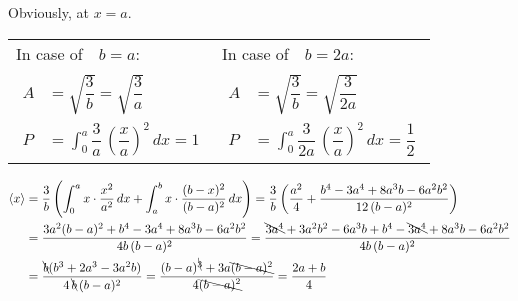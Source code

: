 
        {\color{hwSolution}
            Obviously, at $x=a$.
        }


        {\color{hwSolution}
        \begin{center}\begin{tabularx}{\linewidth}{X|X}
            In case of~~$b=a$: & In case of~~$b=2a$:\\
            {\begin{align*}
                A &= \sqrt{\dfrac{3}{b}}
                = \sqrt{\dfrac{3}{a}}\\
                P &= \int_0^a \dfrac{3}{a} \,\left(\dfrac{x}{a}\right)^2\,dx
                = 1
            \end{align*}}
            &
            {\begin{align*}
                A &= \sqrt{\dfrac{3}{b}}
                = \sqrt{\dfrac{3}{2a}}\\
                P &= \int_0^a \dfrac{3}{2a} \,\left(\dfrac{x}{a}\right)^2\,dx
                = \dfrac{1}{2}
            \end{align*}}
        \end{tabularx}\end{center}
        }


        {\color{hwSolution}
            \begin{align*}
                \left<x\right> &= \dfrac{3}{b}\left(
                    \int_0^a x\cdot\dfrac{x^2}{a^2}\,dx
                    +
                    \int_a^b x\cdot\dfrac{(b-x)^2}{(b-a)^2}\,dx
                    \right)
                    = \dfrac{3}{b}\left(\dfrac{a^2}{4}+\dfrac{b^4-3a^4+8a^3b-6a^2b^2}{12\,(b-a)^2}\right)\\
                    &= \dfrac{3a^2(b-a)^2+b^4-3a^4+8a^3b-6a^2b^2}{4b\,(b-a)^2}
                    = \dfrac{\bcancel{3a^4}+3a^2b^2-6a^3b+b^4-\bcancel{3a^4}+8a^3b-6a^2b^2}{4b\,(b-a)^2}\\
                    &= \dfrac{\bcancel{b}(b^3+2a^3-3a^2b)}{4\,\bcancel{b}\,(b-a)^2}
                    = \dfrac{(b-a)^{\bcancel{3}}+3a\bcancel{(b-a)^2}}{4\bcancel{(b-a)^2}}
                    = \dfrac{2a+b}{4}
            \end{align*}
        }